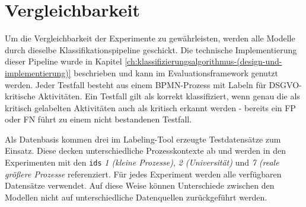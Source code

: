\section{Vergleichbarkeit}\label{sec:einheitliche-klassifizierungspipeline-und-datensatze}

Um die Vergleichbarkeit der Experimente zu gewährleisten, werden alle Modelle durch dieselbe Klassifikationspipeline geschickt. Die technische Implementierung dieser Pipeline wurde in Kapitel \ref{ch:klassifizierungsalgorithmus-(design-und-implementierung)} beschrieben und kann im Evaluationsframework genutzt werden. Jeder Testfall besteht aus einem \ac{BPMN}-Prozess mit Labeln für \ac{DSGVO}-kritische Aktivitäten. Ein Testfall gilt als korrekt klassifiziert, wenn genau die als kritisch gelabelten Aktivitäten auch als kritisch erkannt werden - bereits ein \ac{FP} oder \ac{FN} führt zu einem nicht bestandenen Testfall.

Als Datenbasis kommen drei im Labeling-Tool erzeugte Testdatensätze zum Einsatz. Diese decken unterschiedliche Prozesskontexte ab und werden in den Experimenten mit den \texttt{ids} \emph{1 (kleine Prozesse)}, \emph{2 (Universität)} und \emph{7 (reale größere Prozesse} referenziert. Für jedes Experiment werden alle verfügbaren Datensätze verwendet. Auf diese Weise können Unterschiede zwischen den Modellen nicht auf unterschiedliche Datenquellen zurückgeführt werden.